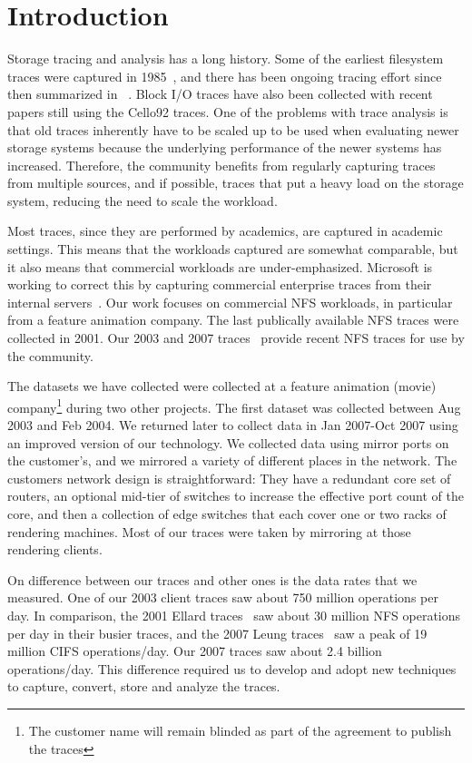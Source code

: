 \section{Introduction}

Storage tracing and analysis has a long history.  Some of the earliest
filesystem traces were captured in 1985~\cite{ousterhout85}, and there
has been ongoing tracing effort since then summarized in
~\cite{LeungUsenix08}.  Block I/O traces have also been collected with
recent papers still using the Cello92 traces.  One of the problems
with trace analysis is that old traces inherently have to be scaled up
to be used when evaluating newer storage systems because the
underlying performance of the newer systems has increased.  Therefore,
the community benefits from regularly capturing traces from multiple
sources, and if possible, traces that put a heavy load on the storage
system, reducing the need to scale the workload.

Most traces, since they are performed by academics, are captured in
academic settings.  This means that the workloads captured are
somewhat comparable, but it also means that commercial workloads are
under-emphasized.  Microsoft is working to correct this by capturing
commercial enterprise traces from their internal
servers~\cite{snia-iotta-microsoft}.  Our work focuses on commercial
NFS workloads, in particular from a feature animation company.  The
last publically available NFS traces were collected in 2001.  Our 2003
and 2007 traces~\cite{animation-bear-traces} provide recent NFS traces
for use by the community.

The datasets we have collected were collected at a feature animation
(movie) company\footnote{The customer name will remain blinded as part
of the agreement to publish the traces} during two other projects.
The first dataset was collected between Aug 2003 and Feb 2004.  We
returned later to collect data in Jan 2007-Oct 2007 using an
improved version of our technology.  We collected data using mirror
ports on the customer's, and we mirrored a variety of different places
in the network.  The customers network design is straightforward: They
have a redundant core set of routers, an optional mid-tier of switches
to increase the effective port count of the core, and then a
collection of edge switches that each cover one or two racks of
rendering machines.  Most of our traces were taken by mirroring at
those rendering clients.

On difference between our traces and other ones is the data rates that
we measured.  One of our 2003 client traces saw about 750 million
operations per day.  In comparison, the 2001 Ellard
traces~\cite{EllardFast03} saw about 30 million NFS operations per day
in their busier traces, and the 2007 Leung traces~\cite{LeungUsenix08}
saw a peak of 19 million CIFS operations/day.  Our 2007 traces saw
about 2.4 billion operations/day.  This difference required us to
develop and adopt new techniques to capture, convert, store and
analyze the traces.

